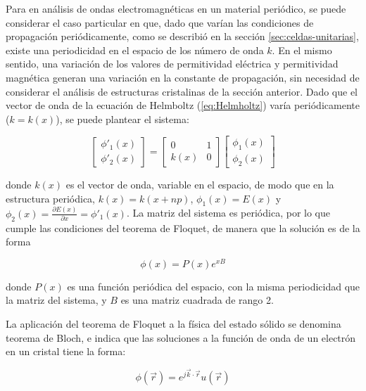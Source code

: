 Para en análisis de ondas electromagnéticas en un material periódico, se puede considerar el caso particular en que, dado que varían las condiciones de propagación periódicamente, como se describió en la sección \ref{sec:celdas-unitarias}, existe una periodicidad en el espacio de los número de onda $k$. En el mismo sentido, una variación de los valores de permitividad eléctrica y permitividad magnética generan una variación en la constante de propagación, sin necesidad de considerar el análisis de estructuras cristalinas de la sección anterior. Dado que el vector de onda de la ecuación de Helmboltz (\ref{eq:Helmholtz}) varía periódicamente ($k = k(x)$), se puede plantear el sistema:

\begin{equation}
	\begin{bmatrix}
		\phi'_1(x) \\
		\phi'_2(x)
	\end{bmatrix}
	=
	\begin{bmatrix}
		0 & 1 \\
		k(x) & 0
	\end{bmatrix}
	\begin{bmatrix}
		\phi_1(x) \\
		\phi_2(x)
	\end{bmatrix}
\end{equation}

donde $k(x)$ es el vector de onda, variable en el espacio, de modo que en la estructura periódica, $k(x) = k(x+n p)$, $\phi_1(x) = E(x)$ y $\phi_2(x) = \frac{\partial E(x)}{\partial x} = \phi'_1(x)$. La matriz del sistema es periódica, por lo que cumple las condiciones del teorema de Floquet, de manera que la solución es de la forma

\begin{equation}
	\phi(x) = P(x) e^{xB}
\end{equation}

donde $P(x)$ es una función periódica del espacio, con la misma periodicidad que la matriz del sistema, y $B$ es una matriz cuadrada de rango 2.

La aplicación del teorema de Floquet a la física del estado sólido se denomina teorema de Bloch, e indica que las soluciones a la función de onda de un electrón en un cristal tiene la forma:

\begin{equation}
\phi(\vec{r}) = e^{j\vec{k} \cdot \vec{r}} u(\vec{r})
\end{equation}

